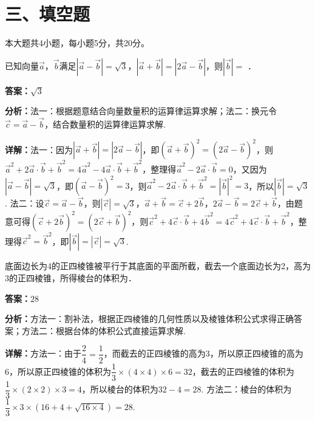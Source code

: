 \section*{三、填空题}
本大题共4小题，每小题5分，共20分。

\begin{question}[points=5]
已知向量$\vec{a}$，$\vec{b}$满足$|\vec{a}-\vec{b}|=\sqrt{3}$，$|\vec{a}+\vec{b}|=|2\vec{a}-\vec{b}|$，则$|\vec{b}|=$ ．
\fillin[{$\sqrt{3}$}]
\begin{solution}
\textbf{答案：}$\sqrt{3}$

\textbf{分析：}法一：根据题意结合向量数量积的运算律运算求解；法二：换元令$\vec{c}=\vec{a}-\vec{b}$，结合数量积的运算律运算求解.

\textbf{详解：}法一：因为$|\vec{a}+\vec{b}|=|2\vec{a}-\vec{b}|$，即$(\vec{a}+\vec{b})^{2}=(2\vec{a}-\vec{b})^{2}$，则$\vec{a}^{2}+2\vec{a}\cdot\vec{b}+\vec{b}^{2}=4\vec{a}^{2}-4\vec{a}\cdot\vec{b}+\vec{b}^{2}$，整理得$\vec{a}^{2}-2\vec{a}\cdot\vec{b}=0$，又因为$|\vec{a}-\vec{b}|=\sqrt{3}$，即$(\vec{a}-\vec{b})^{2}=3$，则$\vec{a}^{2}-2\vec{a}\cdot\vec{b}+\vec{b}^{2}=|\vec{b}|^{2}=3$，所以$|\vec{b}|=\sqrt{3}$.
法二：设$\vec{c}=\vec{a}-\vec{b}$，则$|\vec{c}|=\sqrt{3}$，$\vec{a}+\vec{b}=\vec{c}+2\vec{b}$，$2\vec{a}-\vec{b}=2\vec{c}+\vec{b}$，由题意可得$(\vec{c}+2\vec{b})^{2}=(2\vec{c}+\vec{b})^{2}$，则$\vec{c}^{2}+4\vec{c}\cdot\vec{b}+4\vec{b}^{2}=4\vec{c}^{2}+4\vec{c}\cdot\vec{b}+\vec{b}^{2}$，整理得$\vec{c}^{2}=\vec{b}^{2}$，即$|\vec{b}|=|\vec{c}|=\sqrt{3}$.
\end{solution}
\end{question}

\begin{question}[points=5]
底面边长为4的正四棱锥被平行于其底面的平面所截，截去一个底面边长为2，高为3的正四棱锥，所得棱台的体积为．
\fillin[{$28$}]
\begin{solution}
\textbf{答案：}$28$

\textbf{分析：}方法一：割补法，根据正四棱锥的几何性质以及棱锥体积公式求得正确答案；方法二：根据台体的体积公式直接运算求解.

\textbf{详解：}方法一：由于$\dfrac{2}{4}=\dfrac{1}{2}$，而截去的正四棱锥的高为3，所以原正四棱锥的高为6，所以原正四棱锥的体积为$\dfrac{1}{3}\times(4\times4)\times6=32$，截去的正四棱锥的体积为$\dfrac{1}{3}\times(2\times2)\times3=4$，所以棱台的体积为$32-4=28$.
方法二：棱台的体积为$\dfrac{1}{3}\times3\times(16+4+\sqrt{16\times4})=28$.
\end{solution}
\end{question}

